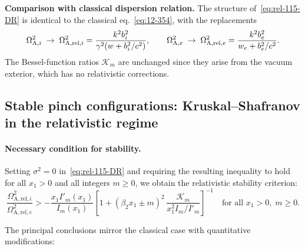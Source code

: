 \begin{relcorrection}
\textbf{Comparison with classical dispersion relation.}
The structure of~\eqref{eq:rel-115-DR} is identical to the classical
eq.~\eqref{eq:12-354}, with the replacements
\[
\Omega_{\mathrm{A},i}^{2} \;\to\;
  \Omega_{\mathrm{A,rel},i}^{2}
  = \frac{k^{2}b_{i}^{2}}{\gamma^{2}(w+b_{i}^{2}/c^{2})},
\qquad
\Omega_{\mathrm{A},e}^{2} \;\to\;
  \Omega_{\mathrm{A,rel},e}^{2}
  = \frac{k^{2}b_{e}^{2}}{w_{e}+b_{e}^{2}/c^{2}}.
\]
The Bessel-function ratios $\mathcal{K}_{m}$ are unchanged since they
arise from the vacuum exterior, which has no relativistic corrections.
\end{relcorrection}

\subsection{Stable pinch configurations: Kruskal--Shafranov in the
relativistic regime}
\label{sec:rel-115-stable}

\paragraph{Necessary condition for stability.}
Setting $\sigma^{2} = 0$ in~\eqref{eq:rel-115-DR} and requiring
the resulting inequality to hold for all $x_{1} > 0$ and all integers
$m \ge 0$, we obtain the relativistic stability criterion:
\begin{equation}
\label{eq:rel-115-stab-crit}
\frac{\Omega_{\mathrm{A,rel},i}^{2}}
  {\Omega_{\mathrm{A,rel},e}^{2}}
  > -\frac{x_{1}I'_{m}(x_{1})}{I_{m}(x_{1})}
  \left[1 + (\beta_{2}x_{1}\pm m)^{2}\,
    \frac{\mathcal{K}_{m}}{x_{1}^{2}I_{m}/I'_{m}}\right]^{-1}
\quad
\text{for all } x_{1}>0,\; m\ge 0.
\end{equation}

The principal conclusions mirror the classical case with quantitative
modifications:

